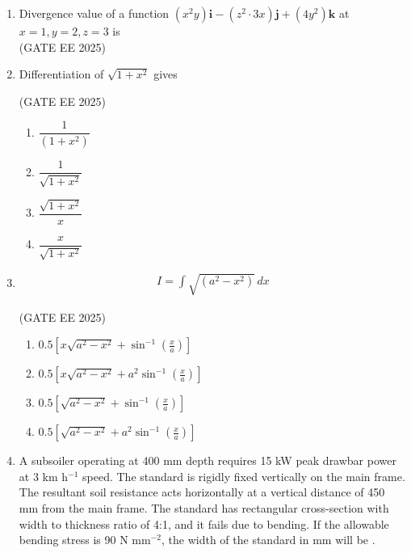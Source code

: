 \documentclass[journal,12pt,onecolumn]{IEEEtran}
\theoremstyle{remark}
\begin{document}
\begin{enumerate}
\item Divergence value of a function $(x^2 y)\mathbf{i} - (z^2 \cdot 3x)\mathbf{j} + (4y^2)\mathbf{k}$ at $x=1, y=2, z=3$ is \underline{\hspace{2cm}}\\

\hfill(GATE EE 2025)
\newpage
\item Differentiation of $\sqrt{1+x^2}$ gives  

\hfill(GATE EE 2025)

\begin{multicols}{2}
\begin{enumerate}
\item $\dfrac{1}{(1+x^2)}$  
\item $\dfrac{1}{\sqrt{1+x^2}}$  
\item $\dfrac{\sqrt{1+x^2}}{x}$  
\item $\dfrac{x}{\sqrt{1+x^2}}$  
\end{enumerate}
\end{multicols} 

\item
\begin{align*}
I = \int\sqrt{(a^2 - x^2)} \, dx
\end{align*}

\hfill(GATE EE 2025)

\begin{multicols}{2}
\begin{enumerate}
\item $0.5 \left[ x\sqrt{a^2 - x^2} + \sin^{-1}\!\left(\tfrac{x}{a}\right) \right]$  
\item $0.5 \left[ x\sqrt{a^2 - x^2} + a^2 \sin^{-1}\!\left(\tfrac{x}{a}\right) \right]$  
\item $0.5 \left[ \sqrt{a^2 - x^2} + \sin^{-1}\!\left(\tfrac{x}{a}\right) \right]$  
\item $0.5 \left[ \sqrt{a^2 - x^2} + a^2 \sin^{-1}\!\left(\tfrac{x}{a}\right) \right]$  
\end{enumerate}
\end{multicols}

\item A subsoiler operating at 400 mm depth requires 15 kW peak drawbar power at 3 km h$^{-1}$ speed. The standard is rigidly fixed vertically on the main frame. The resultant soil resistance acts horizontally at a vertical distance of 450 mm from the main frame. The standard has rectangular cross-section with width to thickness ratio of 4:1, and it fails due to bending. If the allowable bending stress is 90 N mm$^{-2}$, the width of the standard in mm will be \underline{\hspace{2cm}}. 


\end{enumerate}
\end{document}
